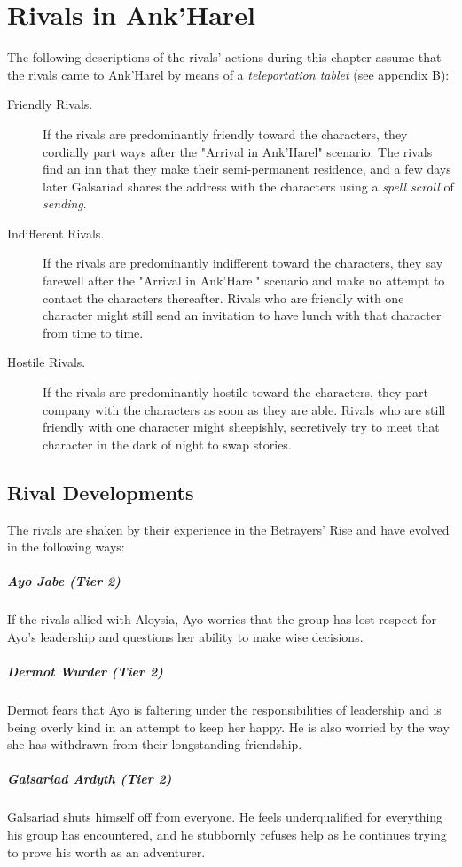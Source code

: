 \documentclass[10pt,a4paper,twoside,bg=print,twocolumn,openany,nodeprecatedcode]{dndbook}
\begin{document}
\section{Rivals in Ank'Harel}
The following descriptions of the rivals' actions during this chapter assume that the rivals came to Ank'Harel by means of a \textit{teleportation tablet} (see appendix B):


\begin{description}
\item[Friendly Rivals.]
If the rivals are predominantly friendly toward the characters, they cordially part ways after the "Arrival in Ank'Harel" scenario. The rivals find an inn that they make their semi-permanent residence, and a few days later Galsariad shares the address with the characters using a \textit{spell scroll} of \textit{sending}.
\item[Indifferent Rivals.]
If the rivals are predominantly indifferent toward the characters, they say farewell after the "Arrival in Ank'Harel" scenario and make no attempt to contact the characters thereafter. Rivals who are friendly with one character might still send an invitation to have lunch with that character from time to time.
\item[Hostile Rivals.]
If the rivals are predominantly hostile toward the characters, they part company with the characters as soon as they are able. Rivals who are still friendly with one character might sheepishly, secretively try to meet that character in the dark of night to swap stories.
\end{description}

\subsection{Rival Developments}
The rivals are shaken by their experience in the Betrayers' Rise and have evolved in the following ways:

\subparagraph{Ayo Jabe (Tier 2)}
If the rivals allied with Aloysia, Ayo worries that the group has lost respect for Ayo's leadership and questions her ability to make wise decisions.

\subparagraph{Dermot Wurder (Tier 2)}
Dermot fears that Ayo is faltering under the responsibilities of leadership and is being overly kind in an attempt to keep her happy. He is also worried by the way she has withdrawn from their longstanding friendship.

\subparagraph{Galsariad Ardyth (Tier 2)}
Galsariad shuts himself off from everyone. He feels underqualified for everything his group has encountered, and he stubbornly refuses help as he continues trying to prove his worth as an adventurer.
\end{document}
